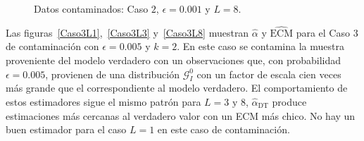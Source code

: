\begin{figure}[htb]
	\caption{\label{Caso2L8}\small Datos contaminados: Caso $2$, $\epsilon=0.001$  y $L=8$.}
\end{figure}

Las figuras~\ref{Caso3L1},~\ref{Caso3L3} y~\ref{Caso3L8} muestran $\widehat{\alpha}$ y $\widehat{\text{ECM}}$ para el Caso 3 de contaminación con $\epsilon=0.005$ y $k=2$. En este caso se contamina la muestra proveniente del modelo verdadero con un observaciones que, con probabilidad $\epsilon=0.005$, provienen de una distribución $\mathcal G_I^0$ con un factor de escala cien veces más grande que el correspondiente al modelo verdadero. El comportamiento de estos estimadores sigue el mismo patrón para $L=3 \text{ y } 8$, $\widehat\alpha_{\text{DT}}$ produce estimaciones más cercanas al verdadero valor con un ECM más chico. No hay un buen estimador para el caso $L=1$ en este caso de contaminación.

